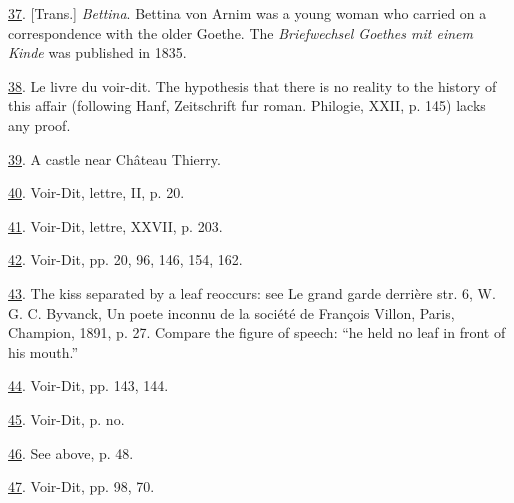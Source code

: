 \protect\hypertarget{23_NOTES.xhtmlux5cux23id_1416}{\protect\hyperlink{11_Chapter_Four__THE_FORMS_OF_LOVE.xhtmlux5cux23id_1415}{37}}.
{[}Trans.{]} \emph{Bettina}. Bettina von Arnim was a young woman who
carried on a correspondence with the older Goethe. The
\emph{Briefwechsel Goethes mit einem Kinde} was published in 1835.

\protect\hypertarget{23_NOTES.xhtmlux5cux23id_1414}{\protect\hyperlink{11_Chapter_Four__THE_FORMS_OF_LOVE.xhtmlux5cux23id_1413}{38}}.
Le livre du voir-dit. The hypothesis that there is no reality to the
history of this affair (following Hanf, Zeitschrift fur roman. Philogie,
XXII, p. 145) lacks any proof.

\protect\hypertarget{23_NOTES.xhtmlux5cux23id_1412}{\protect\hyperlink{11_Chapter_Four__THE_FORMS_OF_LOVE.xhtmlux5cux23id_1411}{39}}.
A castle near Château Thierry.

\protect\hypertarget{23_NOTES.xhtmlux5cux23id_1410}{\protect\hyperlink{11_Chapter_Four__THE_FORMS_OF_LOVE.xhtmlux5cux23id_1409}{40}}.
Voir-Dit, lettre, II, p. 20.

\protect\hypertarget{23_NOTES.xhtmlux5cux23id_1408}{\protect\hyperlink{11_Chapter_Four__THE_FORMS_OF_LOVE.xhtmlux5cux23id_1407}{41}}.
Voir-Dit, lettre, XXVII, p. 203.

\protect\hypertarget{23_NOTES.xhtmlux5cux23id_1406}{\protect\hyperlink{11_Chapter_Four__THE_FORMS_OF_LOVE.xhtmlux5cux23id_1405}{42}}.
Voir-Dit, pp. 20, 96, 146, 154, 162.

\protect\hypertarget{23_NOTES.xhtmlux5cux23id_1404}{\protect\hyperlink{11_Chapter_Four__THE_FORMS_OF_LOVE.xhtmlux5cux23id_1403}{43}}.
The kiss separated by a leaf reoccurs: see Le grand garde derrière str.
6, W. G. C. Byvanck, Un poete inconnu de la société de François Villon,
Paris, Champion, 1891, p. 27. Compare the figure of speech: ``he held no
leaf in front of his mouth.''

\protect\hypertarget{23_NOTES.xhtmlux5cux23id_1402}{\protect\hyperlink{11_Chapter_Four__THE_FORMS_OF_LOVE.xhtmlux5cux23id_1401}{44}}.
Voir-Dit, pp. 143, 144.

\protect\hypertarget{23_NOTES.xhtmlux5cux23id_1400}{\protect\hyperlink{11_Chapter_Four__THE_FORMS_OF_LOVE.xhtmlux5cux23id_1399}{45}}.
Voir-Dit, p. no.

\protect\hypertarget{23_NOTES.xhtmlux5cux23id_1398}{\protect\hyperlink{11_Chapter_Four__THE_FORMS_OF_LOVE.xhtmlux5cux23id_1397}{46}}.
See above, p. 48.

\protect\hypertarget{23_NOTES.xhtmlux5cux23id_1396}{\protect\hyperlink{11_Chapter_Four__THE_FORMS_OF_LOVE.xhtmlux5cux23id_1395}{47}}.
Voir-Dit, pp. 98, 70.

